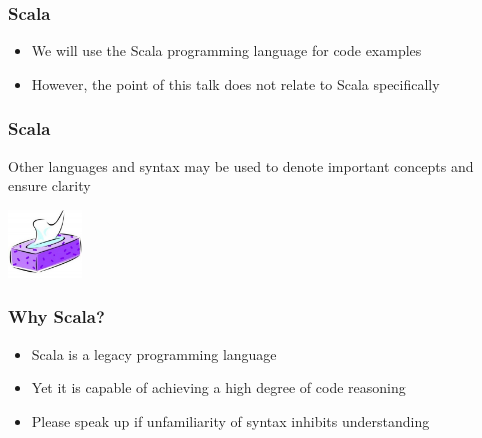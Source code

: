 \begin{frame}
\frametitle{Scala}
\begin{itemize}
  \item We will use the Scala programming language for code examples
  \item However, the point of this talk does not relate to Scala specifically
\end{itemize}
\end{frame}

\begin{frame}
\frametitle{Scala}
\begin{center}
Other languages and syntax may be used to denote important concepts and ensure clarity
\end{center}
\begin{center}
\includegraphics[height=1.8cm]{image/tissues.jpg}
\end{center}
\end{frame}

\begin{frame}
\frametitle{Why Scala?}
\begin{itemize}
  \item Scala is a legacy programming language
  \item Yet it is capable of achieving a high degree of code reasoning
  \item Please speak up if unfamiliarity of syntax inhibits understanding
\end{itemize}
\end{frame}

